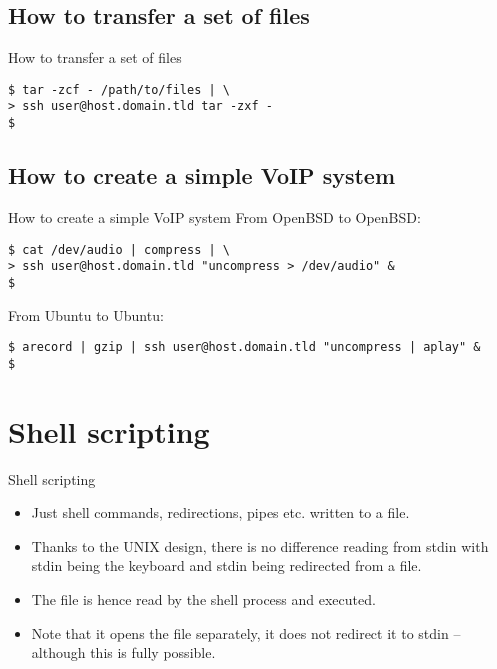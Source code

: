\documentclass[handout]{beamer}
\begin{document}
\subsection{How to transfer a set of files}
\begin{frame}[fragile]{How to transfer a set of files}
	\begin{lstlisting}
$ tar -zcf - /path/to/files | \
> ssh user@host.domain.tld tar -zxf -
$
	\end{lstlisting}
\end{frame}

\subsection{How to create a simple VoIP system}
\begin{frame}[fragile]{How to create a simple VoIP system}
	From OpenBSD to OpenBSD:
	\begin{lstlisting}
$ cat /dev/audio | compress | \
> ssh user@host.domain.tld "uncompress > /dev/audio" &
$
	\end{lstlisting}

	\pause
	From Ubuntu to Ubuntu:
	\begin{lstlisting}
$ arecord | gzip | ssh user@host.domain.tld "uncompress | aplay" &
$
	\end{lstlisting}
\end{frame}


\section{Shell scripting}
\begin{frame}{Shell scripting}
	\begin{itemize}
		\item<1-> Just shell commands, redirections, pipes etc. written to a file.
		\item<2> Thanks to the UNIX design, there is no difference reading from 
			stdin with stdin being the keyboard and stdin being redirected from 
			a file.
		\item<3-4> The file is hence read by the shell process and executed.
		\item<4> Note that it opens the file separately, it does not redirect it to 
			stdin -- although this is fully possible.
	\end{itemize}
\end{frame}
\end{document}
